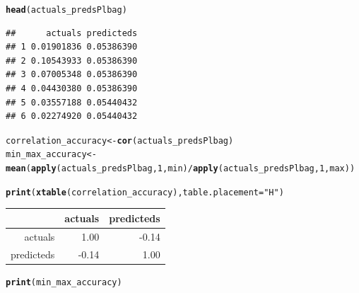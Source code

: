 \documentclass[10pt]{article}\usepackage[]{graphicx}\usepackage[]{color}
\makeatletter
\newcommand{\hlnum}[1]{\textcolor[rgb]{0.686,0.059,0.569}{#1}}%
\newcommand{\hlstr}[1]{\textcolor[rgb]{0.192,0.494,0.8}{#1}}%
\newcommand{\hlopt}[1]{\textcolor[rgb]{0,0,0}{#1}}%
\newcommand{\hlstd}[1]{\textcolor[rgb]{0.345,0.345,0.345}{#1}}%
\newcommand{\hlkwb}[1]{\textcolor[rgb]{0.69,0.353,0.396}{#1}}%
\newcommand{\hlkwc}[1]{\textcolor[rgb]{0.333,0.667,0.333}{#1}}%
\newcommand{\hlkwd}[1]{\textcolor[rgb]{0.737,0.353,0.396}{\textbf{#1}}}%
\newenvironment{kframe}{%
 \def\at@end@of@kframe{}%
 \ifinner\ifhmode%
  \def\at@end@of@kframe{\end{minipage}}%
  \begin{minipage}{\columnwidth}%
 \fi\fi%
 \def\FrameCommand##1{\hskip\@totalleftmargin \hskip-\fboxsep
 \colorbox{shadecolor}{##1}\hskip-\fboxsep
     \hskip-\linewidth \hskip-\@totalleftmargin \hskip\columnwidth}%
 \MakeFramed {\advance\hsize-\width
   \@totalleftmargin\z@ \linewidth\hsize
   \@setminipage}}%
 {\par\unskip\endMakeFramed%
 \at@end@of@kframe}
\newenvironment{knitrout}{}{} %
\makeatother
\begin{document}
\begin{knitrout}
\begin{kframe}
\begin{alltt}
\hlkwd{head}\hlstd{(actuals_predsPlbag)}
\end{alltt}
\begin{verbatim}
##      actuals predicteds
## 1 0.01901836 0.05386390
## 2 0.10543933 0.05386390
## 3 0.07005348 0.05386390
## 4 0.04430380 0.05386390
## 5 0.03557188 0.05440432
## 6 0.02274920 0.05440432
\end{verbatim}
\begin{alltt}
\hlstd{correlation_accuracy} \hlkwb{<-} \hlkwd{cor}\hlstd{(actuals_predsPlbag)}
\hlstd{min_max_accuracy} \hlkwb{<-} \hlkwd{mean}\hlstd{(}\hlkwd{apply}\hlstd{(actuals_predsPlbag,} \hlnum{1}\hlstd{, min)} \hlopt{/} \hlkwd{apply}\hlstd{(actuals_predsPlbag,} \hlnum{1}\hlstd{, max))}
\end{alltt}
\end{kframe}
\end{knitrout}


\begin{kframe}
\begin{alltt}
\hlkwd{print}\hlstd{(}\hlkwd{xtable}\hlstd{(correlation_accuracy),}\hlkwc{table.placement}\hlstd{=}\hlstr{"H"}\hlstd{)}
\end{alltt}
\end{kframe}%
\begin{table}[H]
\centering
\begin{tabular}{rrr}
  \hline
 & actuals & predicteds \\ 
  \hline
actuals & 1.00 & -0.14 \\ 
  predicteds & -0.14 & 1.00 \\ 
   \hline
\end{tabular}
\end{table}
\begin{kframe}\begin{alltt}
\hlkwd{print}\hlstd{(min_max_accuracy)}
\end{alltt}
\end{kframe}[1] 0.6891403
\end{document}
